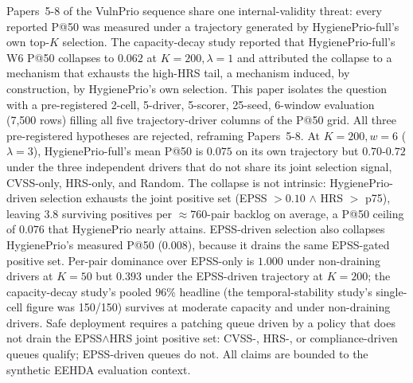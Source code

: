 Papers~5-8 of the VulnPrio sequence share one internal-validity
threat: every reported P@50 was measured under a trajectory generated
by HygienePrio-full's own top-$K$ selection. The capacity-decay study reported that
HygienePrio-full's W6 P@50 collapses to $0.062$ at
$K = 200, \lambda = 1$ and attributed the collapse to a mechanism that
exhausts the high-HRS tail, a mechanism induced, by construction,
by HygienePrio's own selection. This paper isolates the question with
a pre-registered 2-cell, 5-driver, 5-scorer, 25-seed, 6-window
evaluation (7{,}500 rows) filling all five trajectory-driver columns
of the P@50 grid. All three pre-registered hypotheses are rejected,
reframing Papers~5-8. At $K = 200, w = 6$ ($\lambda = 3$),
HygienePrio-full's mean P@50 is $0.075$ on its own trajectory but
$0.70$-$0.72$ under the three independent drivers that do not share
its joint selection signal, CVSS-only, HRS-only, and Random. The
collapse is not intrinsic: HygienePrio-driven selection exhausts the
joint positive set (EPSS $> 0.10$ $\wedge$ HRS $>$ p75), leaving
$3.8$ surviving positives per $\approx 760$-pair backlog on average,
a P@50 ceiling of $0.076$ that HygienePrio nearly attains.
EPSS-driven selection also collapses HygienePrio's measured P@50
($0.008$), because it drains the same EPSS-gated positive set.
Per-pair dominance over EPSS-only is $1.000$ under non-draining
drivers at $K = 50$ but $0.393$ under the EPSS-driven trajectory at
$K = 200$; the capacity-decay study's pooled $96\%$ headline (the temporal-stability study's single-cell
figure was 150/150) survives at moderate capacity and under
non-draining drivers. Safe deployment requires a patching queue
driven by a policy that does not drain the EPSS$\wedge$HRS joint
positive set: CVSS-, HRS-, or compliance-driven queues qualify;
EPSS-driven queues do not. All claims are bounded to the synthetic
EEHDA evaluation context.
